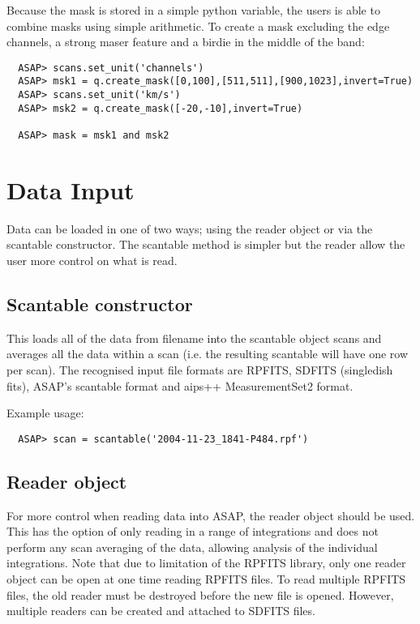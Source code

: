 \documentclass[11pt]{article}
\begin{document}
Because the mask is stored in a simple python variable, the users is
able to combine masks using simple arithmetic. To create a mask
excluding the edge channels, a strong maser feature and a birdie in
the middle of the band:

\begin{verbatim}
  ASAP> scans.set_unit('channels')
  ASAP> msk1 = q.create_mask([0,100],[511,511],[900,1023],invert=True)
  ASAP> scans.set_unit('km/s')
  ASAP> msk2 = q.create_mask([-20,-10],invert=True)

  ASAP> mask = msk1 and msk2
\end{verbatim}


\section{Data Input}

Data can be loaded in one of two ways; using the reader object or via
the scantable constructor. The scantable method is simpler but the
reader allow the user more control on what is read.

\subsection{Scantable constructor}

This loads all of the data from filename into the scantable object scans
and averages all the data within a scan (i.e.  the resulting scantable
will have one row per scan).  The recognised input file formats are
RPFITS, SDFITS (singledish fits), ASAP's scantable format and aips++
MeasurementSet2 format. 


Example usage:

\begin{verbatim}
  ASAP> scan = scantable('2004-11-23_1841-P484.rpf')
\end{verbatim}


\subsection{Reader object}

For more control when reading data into ASAP, the reader object should
be used.  This has the option of only reading in a range of integrations
and does not perform any scan averaging of the data, allowing analysis
of the individual integrations.  Note that due to limitation of the
RPFITS library, only one reader object can be open at one time reading
RPFITS files.  To read multiple RPFITS files, the old reader must be
destroyed before the new file is opened.  However, multiple readers can
be created and attached to SDFITS files. 
\end{document}
